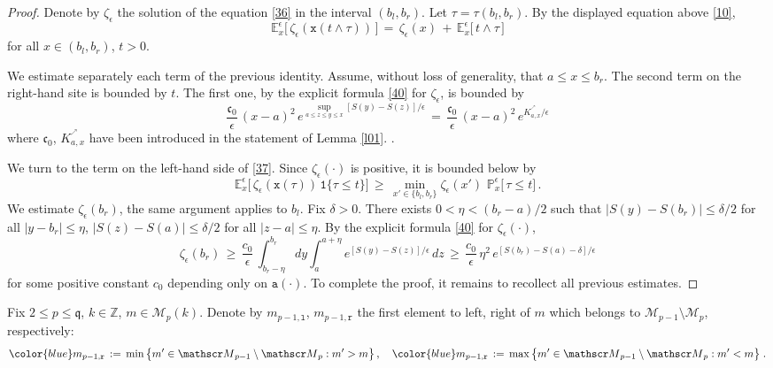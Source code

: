 \documentclass[reqno]{amsart}
\theoremstyle{plain}
\theoremstyle{definition}
\newcommand{\mf}[1]{{\mathfrak #1}}
\newcommand{\bb}[1]{{\mathbb #1}}
\newcommand{\ms}[1]{{\mathscr #1}}
\newcommand{\mtt}[1]{{\mathtt #1}}
\newcommand{\<}{\langle}
\renewcommand{\>}{\rangle}
\begin{document}
\begin{proof}
Denote by $\zeta_\epsilon$ the solution of the equation \eqref{36} in
the interval $(b_l, b_r)$. Let $\tau = \tau(b_l, b_r)$. By the
displayed equation above \eqref{10},
\begin{equation}
\label{37}
\bb E^\epsilon_{x}\big[\,
\zeta_{\epsilon}(\mtt x (t\wedge \tau))\, \big]
\,=\,
\zeta_{\epsilon}(x) \,+\,
\bb E^\epsilon_{x}\big[\, t\wedge \tau\, \big]
\end{equation}
for all $x \in (b_l, b_r)$, $t>0$.

We estimate separately each term of the previous identity. Assume,
without loss of generality, that $a\le x\le b_r$. The second
term on the right-hand site is bounded by $t$. The first one, by the
explicit formula \eqref{40} for $\zeta_\epsilon$, is bounded by
\begin{equation*}
\frac{\mf c_0}{\epsilon}\, (x-a)^2\, e^{\sup_{a\le z\le y\le x}
[S(y)-S(z)]/\epsilon} \,=\,
\frac{\mf c_0}{\epsilon}\, (x-a)^2\, e^{K^{^\nearrow}_{a,x}/\epsilon}
\end{equation*}
where $\mf c_0$, $K^{^\nearrow}_{a,x}$ have been introduced in the
statement of Lemma \ref{l01}. .

We turn to the term on the left-hand side of \eqref{37}. Since
$\zeta_\epsilon(\cdot)$ is positive, it is bounded below by
\begin{equation*}
\bb E^\epsilon_{x}\big[\,
\zeta_{\epsilon}(\mtt x (\tau))\, \mtt 1\{ \tau \le t\} \big]
\,\ge\, \min_{x'\in \{b_l,b_r\}} \zeta_{\epsilon}(x')\,\,
\bb P^\epsilon_{x}\big[\,\tau \le t \big]\,.
\end{equation*}
We estimate $\zeta_{\epsilon}(b_r)$, the same argument applies to
$b_l$. Fix $\delta >0$. There exists $0<\eta< (b_r-a)/2$ such that
$|S(y) - S(b_r)|\le \delta/2$ for all $|y-b_r|\le \eta$,
$|S(z) - S(a)|\le \delta/2$ for all $|z-a|\le \eta$.
By the explicit formula \eqref{40} for $\zeta_{\epsilon} (\cdot)$,
\begin{equation*}
\zeta_{\epsilon}(b_r) \,\ge\, \frac{c_0}{\epsilon}\,
\int_{b_r-\eta}^{b_r} dy\int_a^{a+\eta} e^{[S(y)-S(z)]/\epsilon}\,
dz \,\ge\, \frac{c_0}{\epsilon}\, \eta^2\,
e^{[S(b_r)-S(a) - \delta]/\epsilon}
\end{equation*}
for some positive constant $c_0$ depending only on $\mtt a(\cdot)$. 
To complete the proof, it remains to recollect all previous
estimates. 
\end{proof}

Fix $2\le p\le \mf q$, $k\in \bb Z$, $m\in \ms M_p(k)$. Denote 
by $m_{p-1, \mtt l}$, $m_{p-1, \mtt r}$ the first element to left,
right of $m$ which belongs to $\ms M_{p-1}\setminus \ms M_p$,
respectively:
\begin{equation*}
{\color{blue} m_{p-1, \mtt r}} \,:=\,
\min\big\{m' \in \ms M_{p-1}\setminus \ms M_p :
m'>m \big\}\,, \quad 
{\color{blue} m_{p-1, \mtt r}} \,:=\,
\max \big\{m' \in \ms M_{p-1}\setminus \ms M_p : m'<m \big \} \;.
\end{equation*}
\end{document}
